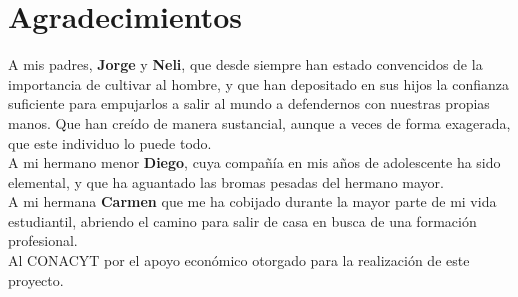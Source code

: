 \chapter*{Agradecimientos}

A mis padres, \textbf{Jorge} y \textbf{Neli}, que desde siempre han estado convencidos de la importancia de cultivar al hombre, y que 
han depositado en sus hijos la confianza suficiente para empujarlos a salir al mundo a 
defendernos con nuestras propias manos. Que han creído de manera sustancial, aunque a veces de forma 
exagerada, que este individuo lo puede todo.\\

A mi hermano menor \textbf{Diego}, cuya compañía en mis años de adolescente ha sido elemental, y que ha 
aguantado las bromas pesadas del hermano mayor.\\

A mi hermana \textbf{Carmen} que me ha cobijado durante la mayor parte de mi vida estudiantil, 
abriendo el camino para salir de casa en busca de una formación profesional.\\

Al CONACYT por el apoyo económico otorgado para la realización de este proyecto.


